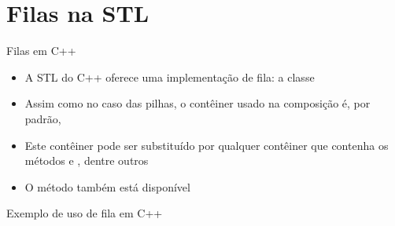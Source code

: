 \section{Filas na STL}

\begin{frame}[fragile]{Filas em C++}

    \begin{itemize}
        \item A STL do C++ oferece uma implementação de fila: a classe 

        \item Assim como no caso das pilhas, o contêiner usado na composição é, por padrão,

        \item Este contêiner pode ser substituído por qualquer contêiner que contenha os métodos
             e , dentre outros

        \item O método  também está disponível
    \end{itemize}

\end{frame}

\begin{frame}[fragile]{Exemplo de uso de fila em C++}
\end{frame}

